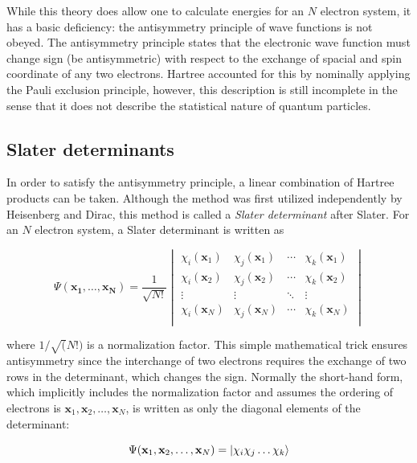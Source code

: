 \begin{doublespace}
While this theory does allow one to calculate energies for an $N$ electron
system, it has a basic deficiency: the antisymmetry principle of wave functions
is not obeyed. The antisymmetry principle states that the electronic wave
function must change sign (be antisymmetric) with respect to the exchange of
spacial and spin coordinate of any two electrons. Hartree accounted for this by
nominally applying the Pauli exclusion principle, however, this description is
still incomplete in the sense that it does not describe the statistical nature
of quantum particles.

\subsection{Slater determinants}

In order to satisfy the antisymmetry principle, a linear combination of Hartree
products can be taken. Although the method was first utilized independently by
Heisenberg\cite{Heisenberg1926} and Dirac,\cite{Dirac1926} this method is
called a \emph{Slater determinant} after Slater.\cite{Slater1929} For an $N$
electron system, a Slater determinant is written as

\begin{equation}
\Psi(\mathbf{x_1},\ldots,\mathbf{x_N}) = \frac{1}{\sqrt{N!}}
\begin{vmatrix}
\chi_i(\mathbf{x}_1) & \chi_j(\mathbf{x}_1) & \cdots & \chi_k(\mathbf{x}_1) \\
\chi_i(\mathbf{x}_2) & \chi_j(\mathbf{x}_2) & \cdots & \chi_k(\mathbf{x}_2) \\
\vdots & \vdots & \ddots & \vdots \\
\chi_i(\mathbf{x}_N) & \chi_j(\mathbf{x}_N) & \cdots & \chi_k(\mathbf{x}_N) \\
\end{vmatrix}
\end{equation}

\noindent where $1/\sqrt(N!)$ is a normalization factor. This simple
mathematical trick ensures antisymmetry since the interchange of two electrons
requires the exchange of two rows in the determinant, which changes the sign.
Normally the short-hand form, which implicitly includes the normalization
factor and assumes the ordering of electrons is
$\mathbf{x}_1,\mathbf{x}_2,\dots,\mathbf{x}_N$, is written as only the diagonal
elements of the determinant:

\begin{equation}
  \Psi(\mathbf{x}_1,\mathbf{x}_2,\dots,\mathbf{x}_N) = \ket{\chi_i\chi_j\dots\chi_k}
\end{equation}


\end{doublespace}
